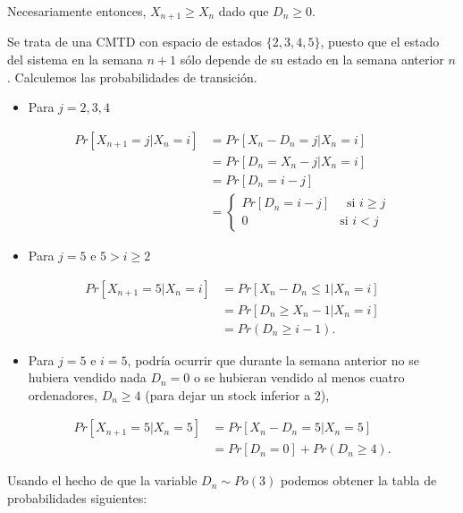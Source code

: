 \documentclass[
]{book}
\providecommand{\tightlist}{%
  \setlength{\itemsep}{0pt}\setlength{\parskip}{0pt}}
\theoremstyle{definition}
\theoremstyle{definition}
\theoremstyle{definition}
\theoremstyle{definition}
\theoremstyle{remark}
\begin{document}
Necesariamente entonces, \(X_{n+1} \geq X_n\) dado que \(D_n \geq 0\).

Se trata de una CMTD con espacio de estados \(\{2, 3, 4, 5\}\), puesto que el estado del sistema en la semana \(n+1\) sólo depende de su estado en la semana anterior \(n\). Calculemos las probabilidades de transición.

\begin{itemize}
\tightlist
\item
  Para \(j= 2, 3, 4\)
\end{itemize}

\[\begin{array}{ll}
Pr[X_{n+1}  = j | X_n = i] & = Pr[X_n - D_n = j | X_n = i]\\
& = Pr[D_n=X_n-j | X_n = i]\\
& = Pr[D_n = i - j] \\
&=\begin{cases}
Pr[D_n = i - j] \quad \text{ si } i\geq j \\
0 \qquad \qquad \qquad \quad \text{ si } i< j
\end{cases}
\end{array}\]

\begin{itemize}
\tightlist
\item
  Para \(j=5\) e \(5>i\geq 2\)
\end{itemize}

\[\begin{array}{ll}
Pr[X_{n+1}  = 5 | X_n = i] & = Pr[X_n - D_n \leq 1 | X_n = i]\\
&=Pr[D_n \geq X_n-1|X_n=i] \\
& = Pr(D_n \geq i - 1).
\end{array}\]

\begin{itemize}
\tightlist
\item
  Para \(j=5\) e \(i=5\), podría ocurrir que durante la semana anterior no se hubiera vendido nada \(D_n=0\) o se hubieran vendido al menos cuatro ordenadores, \(D_n \geq 4\) (para dejar un stock inferior a 2),
\end{itemize}

\[\begin{array}{ll}
Pr[X_{n+1}  = 5 | X_n = 5] & = Pr[X_n - D_n =5 | X_n = 5]\\
&=Pr[D_n =0] + Pr(D_n \geq 4).
\end{array}\]

Usando el hecho de que la variable \(D_n \sim Po(3)\) podemos obtener la tabla de probabilidades siguientes:
\end{document}

